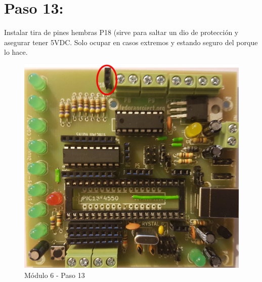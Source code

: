 \newpage

\section{Paso 13:}

Instalar tira de pines hembras P18 (sirve para saltar un dio de protección y asegurar tener 5VDC. Solo ocupar en casos extremos y estando seguro del porque lo hace.

\begin{figure}[h]
	\centering
	\includegraphics[width=0.8\linewidth]{Modulo_6/M6_13}
	\caption{Módulo 6 - Paso 13}
	\label{fig:M6_13}
\end{figure}